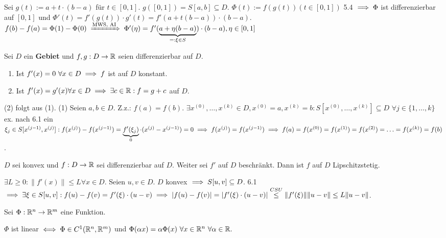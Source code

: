 \documentclass[a4paper,oneside,DIV15,BCOR12mm,chapterprefix=true,headings=onelinechapter]{scrbook}
\begin{document}
\begin{beweis}
Sei $g(t):=a+t\cdot(b-a)$ für $t\in[0,1]$. $g([0,1])=S[a,b]\subseteq D$. $\Phi(t):=f(g(t)) (t \in [0,1])$ 5.4 $\implies \Phi$ ist differenzierbar auf $[0,1]$ und $\Phi'(t) = f'(g(t))\cdot g'(t) = f'(a+t(b-a))\cdot(b-a)$. $f(b)-f(a)=\Phi(1)-\Phi(0) \folgtnach{MWS, AI} \Phi'(\eta) = f'(\underbrace{a+\eta(b-a)}_{=:\xi \in S})\cdot(b-a), \eta \in [0,1]$
\end{beweis}

\begin{folgerungen}
Sei $D$ ein \textbf{Gebiet} und $f,g:D\to\mathbb{R}$ seien differenzierbar auf $D$.
\begin{enumerate}
\item Ist $f'(x)=0\ \forall x \in D \implies f$ ist auf $D$ konstant.
\item Ist $f'(x)=g'(x) \forall x \in D \implies \exists c \in \mathbb{R}: f=g+c$ auf $D$.
\end{enumerate}
\end{folgerungen}

\begin{beweis}
(2) folgt aus (1). (1) Seien $a,b \in D$. Z.z.: $f(a)=f(b)$.
$\exists x^{(0)},\ldots,x^{(k)} \in D, x^{(0)}=a, x^{(k)}=b: S[x^{(0)},\ldots,x^{(k)}] \subseteq D$
$\forall j \in \{1,\ldots,k\}$ ex. nach 6.1 ein $\xi_j \in S[x^{(j-1)}, x^{(j)}]:
f(x^{(j)})-f(x^{(j-1)}) = \underbrace{f'(\xi_j)}_0\cdot(x^{(j)}-x^{(j-1)})=0
\implies f(x^{(j)}) = f(x^{(j-1)}) \implies f(a)=f(x^{(0)})=f(x^{(1)})=f(x^{(2)})=\ldots = f(x^{(k)}) = f(b)$.
\end{beweis}

\begin{satz}
$D$ sei konvex und $f:D\to\mathbb{R}$ sei differenzierbar auf $D$. Weiter sei $f'$ auf $D$ beschränkt. Dann ist $f$ auf $D$ Lipschitzstetig.
\end{satz}

\begin{beweis}
$\exists L \ge 0: \|f'(x)\| \le L \forall x \in D$. Seien $u,v \in D$. $D$ konvex $\implies S[u,v]\subseteq D$. 6.1 $\implies \exists\xi\in S[u,v]:f(u)-f(v)=f'(\xi)\cdot(u-v) \implies |f(u)-f(v)|=|f'(\xi)\cdot(u-v)|\stackrel{CSU}{\le}\|f'(\xi)\| \|u-v\| \le L\|u-v\|$.
\end{beweis}

\begin{satz}[Linearität]
Sei $\Phi:\mathbb{R}^n\to\mathbb{R}^m$ eine Funktion.

$\Phi$ ist linear $\iff \Phi \in C^1(\mathbb{R}^n, \mathbb{R}^m)$ und $\Phi(\alpha x)=\alpha\Phi(x)\ \forall x \in \mathbb{R}^n\ \forall \alpha \in \mathbb{R}.$
\end{satz}
\end{document}
